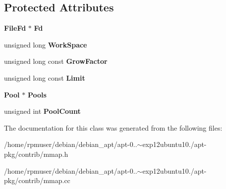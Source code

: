 \subsection*{\-Protected \-Attributes}
\begin{DoxyCompactItemize}
\item 
{\bf \-File\-Fd} $\ast$ {\bfseries \-Fd}\label{classDynamicMMap_a2d52c12bc66139451dca7d4c7cf3f02a}

\item 
unsigned long {\bfseries \-Work\-Space}\label{classDynamicMMap_a273fa6ca039025ec9c00e71a151704c4}

\item 
unsigned long const {\bfseries \-Grow\-Factor}\label{classDynamicMMap_a424afe2d1dbcf4c07e99263d23067c91}

\item 
unsigned long const {\bfseries \-Limit}\label{classDynamicMMap_a4df08c7857ad6dadf80e9c94f7980d96}

\item 
{\bf \-Pool} $\ast$ {\bfseries \-Pools}\label{classDynamicMMap_aff93882f4b3ecb59f12b8935659d13fb}

\item 
unsigned int {\bfseries \-Pool\-Count}\label{classDynamicMMap_a36e34398e81cd673816c2e92803b99d8}

\end{DoxyCompactItemize}


\-The documentation for this class was generated from the following files\-:\begin{DoxyCompactItemize}
\item 
/home/rpmuser/debian/debian\-\_\-apt/apt-\/0..$\sim$exp12ubuntu10./apt-\/pkg/contrib/mmap.\-h\item 
/home/rpmuser/debian/debian\-\_\-apt/apt-\/0..$\sim$exp12ubuntu10./apt-\/pkg/contrib/mmap.\-cc\end{DoxyCompactItemize}
